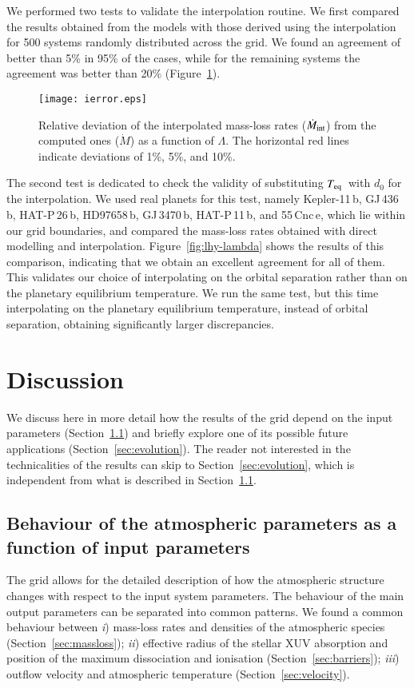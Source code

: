 \documentclass{aa}
\def\Teq{$T_{\rm eq}$}
\begin{document}
{We performed two tests to validate the interpolation routine. We
first compared the results obtained from the models with those
derived using the interpolation for 500 systems randomly
distributed across the grid. We found an agreement of better than
5\% in 95\% of the cases, while for the remaining systems the
agreement was better than 20\% (Figure~\ref{fig:ierr}).}
\begin{figure}
\texttt{[image: ierror.eps]}
\caption{{Relative deviation of the interpolated mass-loss rates
($\dot{M}_{\rm int}$) from the computed ones ($\dot{M}$) as a
function of $\Lambda$. The horizontal red lines indicate
deviations of 1\%, 5\%, and 10\%.}} \label{fig:ierr}
\end{figure}

{The second test is dedicated to check the validity of
substituting \Teq\ with $d_0$ for the interpolation. We used real
planets for this test, namely Kepler-11\,b, GJ\,436\,b,
HAT-P\,26\,b, HD97658\,b, GJ\,3470\,b, HAT-P\,11\,b, and
55\,Cnc\,e, which lie within our grid boundaries, and compared the
mass-loss rates obtained with direct modelling and interpolation.
Figure~\ref{fig:lhy-lambda} shows the results of this comparison,
indicating that we obtain an excellent agreement for all of them.}
This validates our choice of interpolating on the orbital
separation rather than on the planetary equilibrium temperature.
We run the same test, but this time interpolating on the planetary
equilibrium temperature, instead of orbital separation, obtaining
significantly larger discrepancies.
%
\section{Discussion}\label{sec:discussion}
%
We discuss here in more detail how {the results of the grid}
depend on the input parameters (Section~\ref{sec:output-input})
and briefly explore one of its possible future applications
(Section~\ref{sec:evolution}). The reader not interested in the
technicalities of the results can skip to
Section~\ref{sec:evolution}, which is independent from what is
described in Section~\ref{sec:output-input}.
%
\subsection{Behaviour of the atmospheric parameters as a function of input parameters}\label{sec:output-input}
%
The grid allows for the detailed description of how the atmospheric structure changes with respect to the input system parameters. The behaviour of the main output parameters can be separated into common patterns. We found a common behaviour between {\it i}) mass-loss rates and densities of the atmospheric species (Section~\ref{sec:massloss}); {\it ii}) effective radius of the stellar XUV absorption and position of the maximum dissociation and ionisation (Section~\ref{sec:barriers}); {\it iii}) outflow velocity and atmospheric temperature (Section~\ref{sec:velocity}).
%
\end{document}
